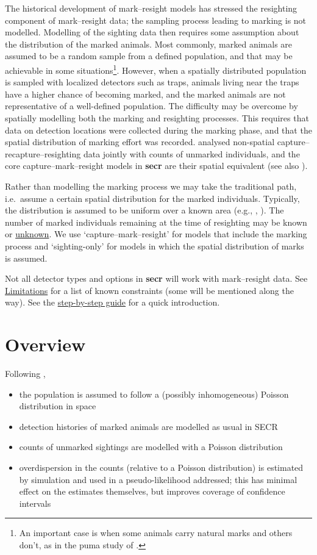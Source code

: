 \documentclass[
]{book}
\providecommand{\tightlist}{%
  \setlength{\itemsep}{0pt}\setlength{\parskip}{0pt}}
\begin{document}
The historical development of mark--resight models has stressed the resighting component of mark--resight data; the sampling process leading to marking is not modelled. Modelling of the sighting data then requires some assumption about the distribution of the marked animals. Most commonly, marked animals are assumed to be a random sample from a defined population, and that may be achievable in some situations\footnote{An important case is when some animals carry natural marks and others don't, as in the puma study of \citet{rksnmapdbed14}.}. However, when a spatially distributed population is sampled with localized detectors such as traps, animals living near the traps have a higher chance of becoming marked, and the marked animals are not representative of a well-defined population. The difficulty may be overcome by spatially modelling both the marking and resighting processes. This requires that data on detection locations were collected during the marking phase, and that the spatial distribution of marking effort was recorded. \citet{mmpcl13} analysed non-spatial capture--recapture--resighting data jointly with counts of unmarked individuals, and the core capture--mark--resight models in \textbf{secr} are their spatial equivalent (see also \citet{whc18}).

Rather than modelling the marking process we may take the traditional path, i.e.~assume a certain spatial distribution for the marked individuals. Typically, the distribution is assumed to be uniform over a known area (e.g., \citet{sgpsmspo13}, \citet{rksnmapdbed14}). The number of marked individuals remaining at the time of resighting may be known or \hyperref[unknownmarked]{unknown}. We use `capture--mark--resight' for models that include the marking process and `sighting-only' for models in which the spatial distribution of marks is assumed.

Not all detector types and options in \textbf{secr} will work with mark--resight data. See \hyperref[MRlimitations]{Limitations} for a list of known constraints (some will be mentioned along the way). See the \hyperref[appendix1]{step-by-step guide} for a quick introduction.

\section{Overview}\label{overview}

Following \citet{eh18},

\begin{itemize}
\tightlist
\item
  the population is assumed to follow a (possibly inhomogeneous) Poisson distribution in space
\item
  detection histories of marked animals are modelled as usual in SECR
\item
  counts of unmarked sightings are modelled with a Poisson distribution
\item
  overdispersion in the counts (relative to a Poisson distribution) is estimated by simulation and used in a pseudo-likelihood addressed; this has minimal effect on the estimates themselves, but improves coverage of confidence intervals
\end{itemize}
\end{document}
